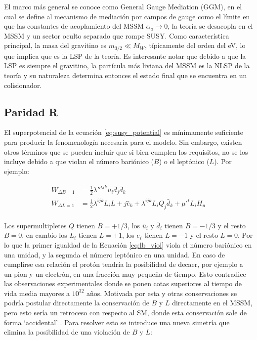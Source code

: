 El marco más general se conoce como General Gauge Mediation (GGM), en el
cual se define al mecanismo de mediación por campos de gauge como el límite en
que las constantes de acoplamiento del MSSM $\alpha_a\to 0$, la teoría se desacopla en el
MSSM y un sector oculto separado que rompe SUSY. Como característica principal, la masa del
gravitino es $m_{3/2} \ll M_W$, típicamente del orden del eV, lo que implica que es la LSP
de la teoría. Es interesante notar que debido a que la LSP es siempre el gravitino, la
partícula más liviana del MSSM es la NLSP de la teoría y su naturaleza determina
entonces el estado final que se encuentra en un colisionador.

\subsection{Paridad R}

El superpotencial de la ecuación \ref{eq:susy_potential} es mínimamente suficiente para producir la fenomenología necesaria para el modelo. Sin embargo, existen otros términos que se pueden incluir que si bien cumplen los requisitos, no se los incluye debido a que violan el número bariónico ($B$) o el leptónico ($L$). Por ejemplo:

\begin{equation}
	\begin{split}
		W_{\Delta B = 1} & = \frac{1}{2}\lambda ''^{ijk}\bar{u}_i\bar{d}_j\bar{d}_k \\
		W_{\Delta L = 1} & = \frac{1}{2}\lambda^{ijk}L_iL+j\bar{e}_k + \lambda^{ijk}L_iQ_j\bar{d}_k + \mu '^{i}L_i H_u \\
	\end{split}
	\label{eq:lb_viol}
\end{equation}

Los supermultipletes $Q$ tienen $B=+1/3$, los $\bar{u}_i$ y $\bar{d}_i$ tienen $B=-1/3$ y el resto $B=0$, en cambio los $L_i$ tienen $L=+1$, los $\bar{e}_i$ tienen $L=-1$ y el resto $L=0$. Por lo que la primer igualdad de la Ecuación \ref{eq:lb_viol} viola el número bariónico en una unidad, y la segunda el número leptónico en una unidad. En caso de cumplirse esa relación el protón tendría la posibilidad de decaer, por ejemplo a un pion y un electrón, en una fracción muy pequeña de tiempo. Esto contradice las observaciones experimentales donde se ponen cotas superiores al tiempo de vida media mayores a $10^{32}$ años. Motivada por esta y otras conservaciones se podría postular directamente la conservación de $B$ y $L$ directamente en el MSSM, pero esto sería un retroceso con respecto al SM, donde esta conservación sale de forma 
`accidental'
. Para resolver esto se introduce una nueva simetría que elimina la posibilidad de una violación de $B$ y $L$:

